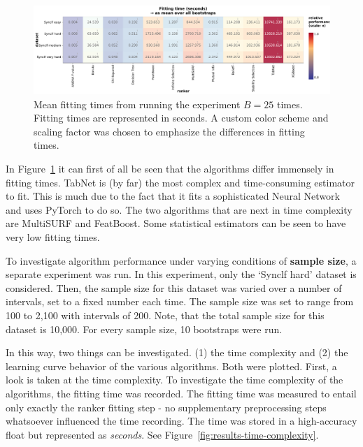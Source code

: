 \documentclass[../main.tex]{subfiles}
\begin{document}
\begin{figure}[ht]
    \centering
    \includegraphics[width=\linewidth]{report/images/results-all-datasets-fitting-time.pdf}
    \caption{Mean fitting times from running the experiment $B=25$ times. Fitting times are represented in seconds. A custom color scheme and scaling factor was chosen to emphasize the differences in fitting times.}
    \label{fig:results-all-datasets-fitting-time}
\end{figure}


In Figure~\ref{fig:results-all-datasets-fitting-time} it can first of all be seen that the algorithms differ immensely in fitting times. TabNet is (by far) the most complex and time-consuming estimator to fit. This is much due to the fact that it fits a sophisticated Neural Network and uses PyTorch to do so. The two algorithms that are next in time complexity are MultiSURF and FeatBoost. Some statistical estimators can be seen to have very low fitting times.

To investigate algorithm performance under varying conditions of \textbf{sample size}, a separate experiment was run. In this experiment, only the `Synclf hard' dataset is considered. Then, the sample size for this dataset was varied over a number of intervals, set to a fixed number each time. The sample size was set to range from 100 to 2,100 with intervals of 200. Note, that the total sample size for this dataset is 10,000. For every sample size, 10 bootstraps were run.

In this way, two things can be investigated. (1) the time complexity and (2) the learning curve behavior of the various algorithms. Both were plotted. First, a look is taken at the time complexity. To investigate the time complexity of the algorithms, the fitting time was recorded. The fitting time was measured to entail only exactly the ranker fitting step - no supplementary preprocessing steps whatsoever influenced the time recording. The time was stored in a high-accuracy float but represented as \textit{seconds}.  See Figure~\ref{fig:results-time-complexity}.
\end{document}
